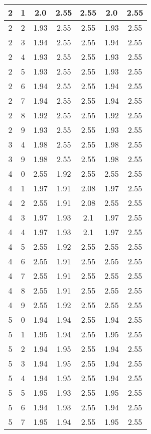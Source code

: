 \begin{longtable}{|c|c||c||c|c||c|c|}
	2 & 1 & 2.0 & 2.55 & 2.55 & 2.0 & 2.55 \\ \hline
	2 & 2 & 1.93 & 2.55 & 2.55 & 1.93 & 2.55 \\ \hline
	2 & 3 & 1.94 & 2.55 & 2.55 & 1.94 & 2.55 \\ \hline
	2 & 4 & 1.93 & 2.55 & 2.55 & 1.93 & 2.55 \\ \hline
	2 & 5 & 1.93 & 2.55 & 2.55 & 1.93 & 2.55 \\ \hline
	2 & 6 & 1.94 & 2.55 & 2.55 & 1.94 & 2.55 \\ \hline
	2 & 7 & 1.94 & 2.55 & 2.55 & 1.94 & 2.55 \\ \hline
	2 & 8 & 1.92 & 2.55 & 2.55 & 1.92 & 2.55 \\ \hline
	2 & 9 & 1.93 & 2.55 & 2.55 & 1.93 & 2.55 \\ \hline
	3 & 4 & 1.98 & 2.55 & 2.55 & 1.98 & 2.55 \\ \hline
	3 & 9 & 1.98 & 2.55 & 2.55 & 1.98 & 2.55 \\ \hline
	4 & 0 & 2.55 & 1.92 & 2.55 & 2.55 & 2.55 \\ \hline
	4 & 1 & 1.97 & 1.91 & 2.08 & 1.97 & 2.55 \\ \hline
	4 & 2 & 2.55 & 1.91 & 2.08 & 2.55 & 2.55 \\ \hline
	4 & 3 & 1.97 & 1.93 & 2.1 & 1.97 & 2.55 \\ \hline
	4 & 4 & 1.97 & 1.93 & 2.1 & 1.97 & 2.55 \\ \hline
	4 & 5 & 2.55 & 1.92 & 2.55 & 2.55 & 2.55 \\ \hline
	4 & 6 & 2.55 & 1.91 & 2.55 & 2.55 & 2.55 \\ \hline
	4 & 7 & 2.55 & 1.91 & 2.55 & 2.55 & 2.55 \\ \hline
	4 & 8 & 2.55 & 1.91 & 2.55 & 2.55 & 2.55 \\ \hline
	4 & 9 & 2.55 & 1.92 & 2.55 & 2.55 & 2.55 \\ \hline
	5 & 0 & 1.94 & 1.94 & 2.55 & 1.94 & 2.55 \\ \hline
	5 & 1 & 1.95 & 1.94 & 2.55 & 1.95 & 2.55 \\ \hline
	5 & 2 & 1.94 & 1.95 & 2.55 & 1.94 & 2.55 \\ \hline
	5 & 3 & 1.94 & 1.95 & 2.55 & 1.94 & 2.55 \\ \hline
	5 & 4 & 1.94 & 1.95 & 2.55 & 1.94 & 2.55 \\ \hline
	5 & 5 & 1.95 & 1.93 & 2.55 & 1.95 & 2.55 \\ \hline
	5 & 6 & 1.94 & 1.93 & 2.55 & 1.94 & 2.55 \\ \hline
	5 & 7 & 1.95 & 1.94 & 2.55 & 1.95 & 2.55 \\ \hline

\end{longtable}
